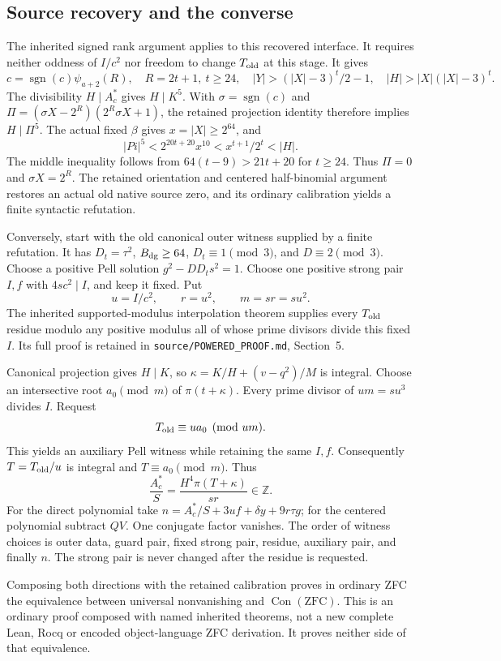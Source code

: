 \subsection{Source recovery and the converse}

The inherited signed rank argument applies to this recovered interface.
It requires neither oddness of $I/c^2$ nor freedom to change
$T_{\rm old}$ at this stage. It gives
\[
 c=\operatorname{sgn}(c)\psi_{a+2}(R),\quad
 R=2t+1,\ t\ge24,\quad
 |Y|>(|X|-3)^t/2-1,\quad |H|>|X|(|X|-3)^t.
\]
The divisibility $H\mid A_c^{\ast}$ gives $H\mid K^5$.
With $\sigma=\operatorname{sgn}(c)$ and
$\Pi=(\sigma X-2^R)(2^R\sigma X+1)$, the retained projection identity
therefore implies $H\mid\Pi^5$. The actual fixed $\beta$ gives
$x=|X|\ge2^{64}$, and
\[
 |Pi|^5<2^{20t+20}x^{10}<x^{t+1}/2^t<|H|.
\]
The middle inequality follows from $64(t-9)>21t+20$ for $t\ge24$.
Thus $\Pi=0$ and $\sigma X=2^R$. The retained orientation and
centered half-binomial argument restores an actual old native source
zero, and its ordinary calibration yields a finite syntactic refutation.

Conversely, start with the old canonical outer witness supplied by a
finite refutation. It has $D_t=\tau^2$, $B_{\rm dg}\ge64$,
$D_t\equiv1\pmod3$, and $D\equiv2\pmod3$.
Choose a positive Pell solution $g^2-DD_ts^2=1$.
Choose one positive strong pair $I,f$ with $4sc^2\mid I$, and keep it
fixed. Put
\[
 u=I/c^2,\qquad r=u^2,\qquad m=sr=su^2.
\]
The inherited supported-modulus interpolation theorem supplies every
$T_{\rm old}$ residue modulo any positive modulus all of whose prime
divisors divide this fixed $I$. Its full proof is retained in
\texttt{source/POWERED\_PROOF.md}, Section~5.

Canonical projection gives $H\mid K$, so
$\kappa=K/H+(v-q^2)/M$ is integral. Choose an intersective root
$a_0\pmod m$ of $\pi(t+\kappa)$. Every prime divisor of $um=su^3$
divides $I$. Request
\[
 T_{\rm old}\equiv ua_0\pmod{um}.
\]
This yields an auxiliary Pell witness while retaining the same $I,f$.
Consequently $T=T_{\rm old}/u$ is integral and $T\equiv a_0\pmod m$.
Thus
\[
 \frac{A_c^{\ast}}S=\frac{H^4\pi(T+\kappa)}{sr}\in\mathbb Z.
\]
For the direct polynomial take
$n=A_c^{\ast}/S+3uf+\delta y+9r\tau g$; for the centered polynomial
subtract $QV$. One conjugate factor vanishes. The order of witness
choices is outer data, guard pair, fixed strong pair, residue,
auxiliary pair, and finally $n$. The strong pair is never changed after
the residue is requested.

Composing both directions with the retained calibration proves in
ordinary ZFC the equivalence between universal nonvanishing and
$\operatorname{Con}(\mathrm{ZFC})$. This is an ordinary proof composed
with named inherited theorems, not a new complete Lean, Rocq or encoded
object-language ZFC derivation. It proves neither side of that equivalence.

